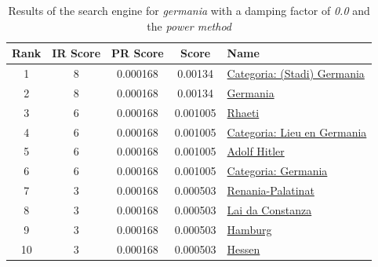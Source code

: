 \documentclass[pdftex,12pt,a4paper]{article}
\begin{document}
\begin{table}[H]
\centering
\begin{tabular}{ | c | c | c | c | l | }
\hline
Rank & IR Score & PR Score &  Score & Name \\ \hline
1 & 8 & 0.000168 & 0.00134 & \href{http://rm.wikipedia.org/wiki/Categoria:(Stadi)_Germania}{Categoria: (Stadi) Germania} \\ \hline
2 & 8 & 0.000168 & 0.00134 & \href{http://rm.wikipedia.org/wiki/Germania}{Germania} \\ \hline
3 & 6 & 0.000168 & 0.001005 & \href{http://rm.wikipedia.org/wiki/Rhaeti}{Rhaeti} \\ \hline
4 & 6 & 0.000168 & 0.001005 & \href{http://rm.wikipedia.org/wiki/Categoria:Lieu_en_Germania}{Categoria: Lieu en Germania} \\ \hline
5 & 6 & 0.000168 & 0.001005 & \href{http://rm.wikipedia.org/wiki/Adolf_Hitler}{Adolf Hitler} \\ \hline
6 & 6 & 0.000168 & 0.001005 & \href{http://rm.wikipedia.org/wiki/Categoria:Germania}{Categoria: Germania} \\ \hline
7 & 3 & 0.000168 & 0.000503 & \href{http://rm.wikipedia.org/wiki/Renania-Palatinat}{Renania-Palatinat} \\ \hline
8 & 3 & 0.000168 & 0.000503 & \href{http://rm.wikipedia.org/wiki/Lai_da_Constanza}{Lai da Constanza} \\ \hline
9 & 3 & 0.000168 & 0.000503 & \href{http://rm.wikipedia.org/wiki/Hamburg}{Hamburg} \\ \hline
10 & 3 & 0.000168 & 0.000503 & \href{http://rm.wikipedia.org/wiki/Hessen}{Hessen} \\ \hline
\end{tabular}
\caption{Results of the search engine for \emph{germania} with a damping factor of \emph{0.0} and the \emph{power method}}
\label{table_d=0.0}
\end{table}
\end{document}
